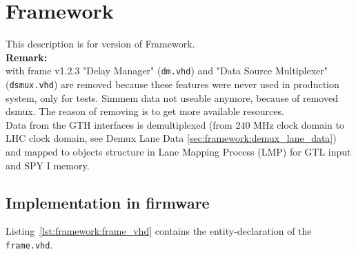 \section{Framework}\label{sec:framework:framework}

This description is for version \versionframe of Framework.\\

\textbf{Remark:}\\
with frame v1.2.3 "Delay Manager" (\texttt{dm.vhd}) and "Data Source Multiplexer" (\texttt{dsmux.vhd}) are removed because these features were never used in production system, only for tests.
Simmem data not useable anymore, because of removed dsmux.
The reason of removing is to get more available resources.\\

%


Data from the GTH interfaces is demultiplexed (from 240 MHz clock domain to LHC clock domain, see Demux Lane Data \ref{sec:framework:demux_lane_data}) and mapped to objects structure in Lane Mapping Process (LMP) for GTL input and SPY I memory.

\subsection{Implementation in firmware}
\label{sec:framework:implementation_firmware}

Listing~\ref{lst:framework:frame_vhd} contains the entity-declaration of the \texttt{frame.vhd}.\\



